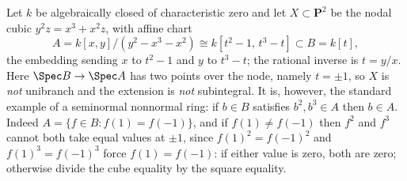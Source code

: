 \begin{example}
\label{ex:ch44-node-seminormal}
Let $k$ be algebraically closed of characteristic zero and let
$X\subset\mathbf P^2$ be the nodal cubic $y^2z=x^3+x^2z$, with affine
chart
\[
 A=k[x,y]/(y^2-x^3-x^2)\cong k[t^2-1,\,t^3-t]\subset B=k[t],
\]
the embedding sending $x$ to $t^2-1$ and $y$ to $t^3-t$;
the rational inverse is $t=y/x$.  Here $\Spec B\to\Spec A$ has two
points over the node, namely $t=\pm1$, so $X$ is \emph{not} unibranch
and the extension is \emph{not} subintegral.  It is, however, the standard
example of a seminormal nonnormal ring: if $b\in B$ satisfies
$b^2,b^3\in A$ then $b\in A$.  Indeed $A=\{f\in B:f(1)=f(-1)\}$, and
if $f(1)\ne f(-1)$ then $f^2$ and $f^3$ cannot both take equal values
at $\pm1$, since $f(1)^2=f(-1)^2$ and $f(1)^3=f(-1)^3$ force
$f(1)=f(-1)$: if either value is zero, both are zero; otherwise
divide the cube equality by the square equality.


\end{example}
